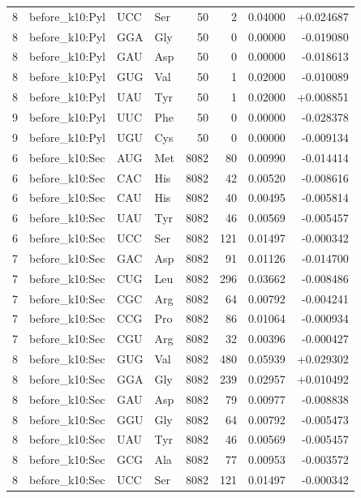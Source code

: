 \begin{longtable}{r l l l r r r r}
8 & before\_k10:Pyl & UCC & Ser & 50 & 2 & 0.04000 & +0.024687 \\
8 & before\_k10:Pyl & GGA & Gly & 50 & 0 & 0.00000 & -0.019080 \\
8 & before\_k10:Pyl & GAU & Asp & 50 & 0 & 0.00000 & -0.018613 \\
8 & before\_k10:Pyl & GUG & Val & 50 & 1 & 0.02000 & -0.010089 \\
8 & before\_k10:Pyl & UAU & Tyr & 50 & 1 & 0.02000 & +0.008851 \\
9 & before\_k10:Pyl & UUC & Phe & 50 & 0 & 0.00000 & -0.028378 \\
9 & before\_k10:Pyl & UGU & Cys & 50 & 0 & 0.00000 & -0.009134 \\
6 & before\_k10:Sec & AUG & Met & 8082 & 80 & 0.00990 & -0.014414 \\
6 & before\_k10:Sec & CAC & His & 8082 & 42 & 0.00520 & -0.008616 \\
6 & before\_k10:Sec & CAU & His & 8082 & 40 & 0.00495 & -0.005814 \\
6 & before\_k10:Sec & UAU & Tyr & 8082 & 46 & 0.00569 & -0.005457 \\
6 & before\_k10:Sec & UCC & Ser & 8082 & 121 & 0.01497 & -0.000342 \\
7 & before\_k10:Sec & GAC & Asp & 8082 & 91 & 0.01126 & -0.014700 \\
7 & before\_k10:Sec & CUG & Leu & 8082 & 296 & 0.03662 & -0.008486 \\
7 & before\_k10:Sec & CGC & Arg & 8082 & 64 & 0.00792 & -0.004241 \\
7 & before\_k10:Sec & CCG & Pro & 8082 & 86 & 0.01064 & -0.000934 \\
7 & before\_k10:Sec & CGU & Arg & 8082 & 32 & 0.00396 & -0.000427 \\
8 & before\_k10:Sec & GUG & Val & 8082 & 480 & 0.05939 & +0.029302 \\
8 & before\_k10:Sec & GGA & Gly & 8082 & 239 & 0.02957 & +0.010492 \\
8 & before\_k10:Sec & GAU & Asp & 8082 & 79 & 0.00977 & -0.008838 \\
8 & before\_k10:Sec & GGU & Gly & 8082 & 64 & 0.00792 & -0.005473 \\
8 & before\_k10:Sec & UAU & Tyr & 8082 & 46 & 0.00569 & -0.005457 \\
8 & before\_k10:Sec & GCG & Ala & 8082 & 77 & 0.00953 & -0.003572 \\
8 & before\_k10:Sec & UCC & Ser & 8082 & 121 & 0.01497 & -0.000342 \\

\end{longtable}
